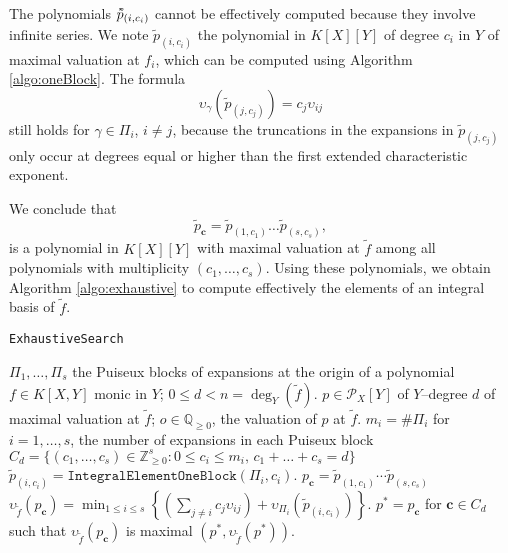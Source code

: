 \documentclass[a4paper,11pt]{amsart}%
\theoremstyle{definition}
\theoremstyle{plain}
\theoremstyle{remark}
\newcommand{\Q}{{\mathbb Q}}
\newcommand{\Z}{{\mathbb Z}}
\newcommand{\vardbtilde}[1]{\tilde{\raisebox{0pt}[0.85\height]{$\tilde{#1}$}}}
\begin{document}
The polynomials $\vardbtilde p_{(i, c_i)}$ cannot be effectively computed because they involve infinite series. We note $\tilde p_{(i, c_i)}$ the polynomial in $K[X][Y]$ of degree $c_i$ in $Y$ of maximal valuation at $f_i$, which can be computed using Algorithm \ref{algo:oneBlock}. The formula $$\upsilon_{\gamma}(\tilde p_{(j, c_j)}) = c_j \upsilon_{ij}$$
still holds for $\gamma \in \Pi_i$, $i \neq j$, because the truncations in the expansions in $\tilde p_{(j, c_j)}$ only occur at degrees equal or higher than the first extended characteristic exponent.

We conclude  that
$$
\tilde p_{\bm{c}} = \tilde p_{(1, c_1)} \dots \tilde p_{(s, c_s)},
$$
is a polynomial in $K[X][Y]$ with maximal valuation at $\tilde f$ among all polynomials with multiplicity $(c_1, \dots, c_s)$. Using these polynomials, we obtain Algorithm \ref{algo:exhaustive} to compute effectively the elements of an integral basis of $\tilde f$.


\begin{algorithm}[h]                      %
\caption{\texttt{ExhaustiveSearch}}          %
\label{algo:exhaustive}
\begin{algorithmic}[1]
\REQUIRE $\Pi_1, \dots, \Pi_s$ the Puiseux blocks of expansions at the origin of a polynomial $f \in K[X,Y]$ monic in $Y$; $0 \leq d < n = \deg_Y(\tilde f)$.
\ENSURE $p \in {\mathcal{P}_{X}}[Y]$ of $Y$--degree $d$ of
maximal valuation at $\tilde f$; $o \in \Q_{\geq 0}$, the valuation of $p$ at $\tilde f$.
\STATE $m_i = \#\Pi_i$ for $i = 1, \dots, s$, the number of expansions in each Puiseux block
\STATE $C_d = \{(c_1, \dots, c_s) \in \Z_{\ge 0}^s : 0 \leq c_i \leq m_i \mbox{, } c_1 + \dots + c_s = d\}$
\STATE $\tilde p_{(i, c_i)} = \texttt{IntegralElementOneBlock}(\Pi_i, c_i)$.
\ENDFOR
\STATE $p_{\bm{c}} = \tilde p_{(1,c_{1})}\cdots \tilde p_{(s, c_{s})}$
\STATE $\upsilon_{\tilde f}(p_{\bm{c}})=\min_{1 \leq i \leq s}\left\{\left(\sum_{j \ne i} c_j \upsilon_{ij}\right) + \upsilon_{\Pi_i}(\tilde p_{(i, c_i)})\right\}$.
\ENDFOR
\STATE $p^{*} = p_{\bm{c}}$ for $\bm{c} \in C_d$ such that $\upsilon_{\tilde f}(p_{\bm{c}})$ is maximal
\RETURN $(p^{*}, \upsilon_{\tilde f}(p^*))$.
\end{algorithmic}
\end{algorithm}
\end{document}
